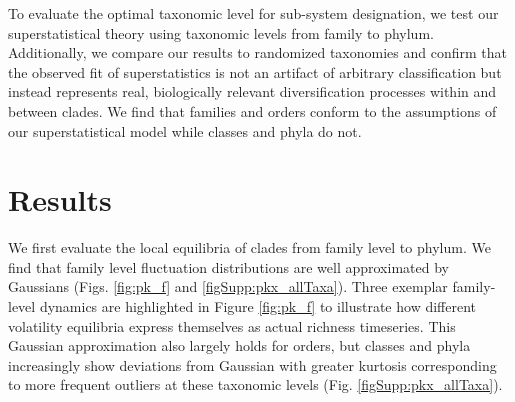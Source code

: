 \documentclass[12pt]{article}
\begin{document}
To evaluate the optimal taxonomic level for sub-system designation, we
test our superstatistical theory using taxonomic levels from family to
phylum. Additionally, we compare our results to randomized taxonomies
and confirm that the observed fit of superstatistics is not an
artifact of arbitrary classification but instead represents real,
biologically relevant diversification processes within and between
clades. We find that families and orders conform to the assumptions of
our superstatistical model while classes and phyla do not.

\section{Results}

We first evaluate the local equilibria of clades from family level to
phylum. We find that family level fluctuation distributions are well
approximated by Gaussians (Figs. \ref{fig:pk_f} and
\ref{figSupp:pkx_allTaxa}).  Three exemplar family-level dynamics are
highlighted in Figure \ref{fig:pk_f} to illustrate how different
volatility equilibria express themselves as actual richness
timeseries.  This Gaussian approximation also largely holds for
orders, but classes and phyla increasingly show deviations from
Gaussian with greater kurtosis corresponding to more frequent outliers
at these taxonomic levels (Fig. \ref{figSupp:pkx_allTaxa}).
\end{document}
